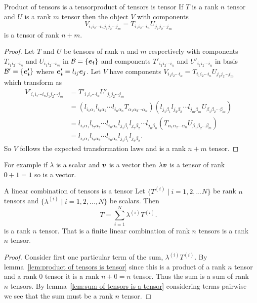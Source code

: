 \documentclass[a4paper]{article}
\newcommand{\basis}{\mathcal{B}}
\newcommand{\veprime}[1]{\vv{e'_{#1}}}
\newcommand{\nindices}[2]{{ {#1}_1 {#1}_2 \dotsm {#1}_{#2} }}
\begin{document}
    \begin{lemma}{Product of tensors is a tensor}{product of tensors is tensor}
        If \(T\) is a rank \(n\) tensor and \(U\) is a rank \(m\) tensor then the object \(V\) with components
        \[V_{\nindices{i}{n}\nindices{j}{m}} = T_{\nindices{i}{n}}U_{\nindices{j}{m}}\]
        is a tensor of rank \(n + m\).
    \end{lemma}
    \begin{proof}
        Let \(T\) and \(U\) be tensors of rank \(n\) and \(m\) respectively with components \(T_\nindices{i}{n}\) and \(U_\nindices{i}{m}\) in \(\basis = \{\ve{i}\}\) and components \(T'_\nindices{i}{n}\) and \(U'_\nindices{i}{n}\) in basis \(\basis' = \{\veprime{i}\}\) where \(\veprime{i} = l_{ij}\ve{j}\).
        Let \(V\) have components \(V_\nindices{i}{n} = T_\nindices{i}{n} U_\nindices{j}{m}\) which transform as
        \begin{align*}
            V'_{\nindices{i}{n}\nindices{j}{m}} &= T'_{\nindices{i}{n}}U'_{\nindices{j}{m}}\\
            &= (l_{i_1\alpha_1}l_{i_2\alpha_2} \dotsm l_{i_n\alpha_n} T_{\nindices{\alpha}{n}})(l_{j_1\beta_1}l_{j_2\beta_2} \dotsm l_{j_m\beta_m} U_{\nindices{\beta}{m}})\\
            &= l_{i_1\alpha_1}l_{i_2\alpha_2} \dotsm l_{i_n\alpha_n} l_{j_1\beta_1}l_{j_2\beta_2} \dotsm l_{j_n\beta_n} (T_{\nindices{\alpha}{n}}U_{\nindices{\beta}{m}})\\
            &= l_{i_1\alpha_1}l_{i_2\alpha_2} \dotsm l_{i_n\alpha_n} l_{j_1\beta_1}l_{j_2\beta_2}.
        \end{align*}
        So \(V\) follows the expected transformation laws and is a rank \(n + m\) tensor.
    \end{proof}
    For example if \(\lambda\) is a scalar and \(\bm{v}\) is a vector then \(\lambda\bm{v}\) is a tensor of rank \(0 + 1 = 1\) so is a vector.
    
    \begin{corollary}{A linear combination of tensors is a tensor}{}
        Let \(\{T^(i)\mid i = 1, 2, \dotsc N \}\) be rank \(n\) tensors and \(\{\lambda^(i)\mid i = 1, 2, \dotsc, N\}\) be scalars.
        Then
        \[T = \sum_{i=1}^{N} \lambda^(i)T^(i).\]
        is a rank \(n\) tensor.
        That is a finite linear combination of rank \(n\) tensors is a rank \(n\) tensor.
    \end{corollary}
    \begin{proof}
        Consider first one particular term of the sum, \(\lambda^{(i)}T^{(i)}\).
        By lemma~\ref{lem:product of tensors is tensor} since this is a product of a rank \(n\) tensor and a rank \(0\) tensor it is a rank \(n + 0 = n\) tensor.
        Thus the sum is a sum of rank \(n\) tensors.
        By lemma~\ref{lem:sum of tensors is a tensor} considering terms pairwise we see that the sum must be a rank \(n\) tensor.
    \end{proof}
    
\end{document}
